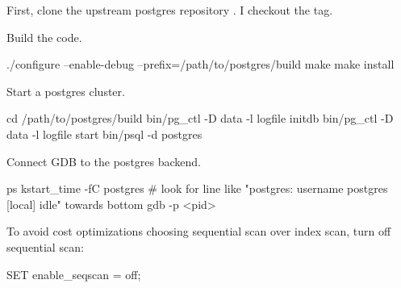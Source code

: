 First, clone the upstream postgres repository
.  I checkout the
 tag.

Build the code.

\begin{bashcode}
./configure --enable-debug --prefix=/path/to/postgres/build
make
make install
\end{bashcode}

Start a postgres cluster.

\begin{bashcode}
cd /path/to/postgres/build
bin/pg_ctl -D data -l logfile initdb
bin/pg_ctl -D data -l logfile start
bin/psql -d postgres
\end{bashcode}

Connect GDB to the postgres backend.

\begin{bashcode}
ps kstart_time -fC postgres
# look for line like "postgres: username postgres [local] idle" towards bottom
gdb -p <pid>
\end{bashcode}

To avoid cost optimizations choosing sequential scan over index scan, turn off
sequential scan:

\begin{sqlcode}
SET enable_seqscan = off;
\end{sqlcode}
